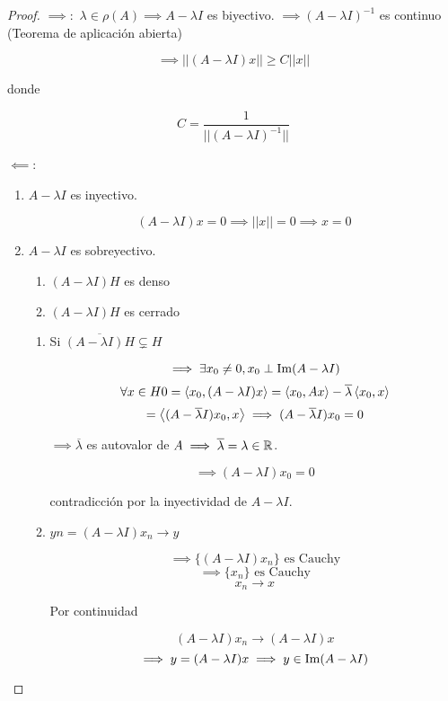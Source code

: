 \begin{proof}
   $\implies:$ $\lambda\in\rho(A)\implies A-\lambda I$ es biyectivo. $\implies (A-\lambda I)^{-1}$ es continuo (Teorema de aplicación abierta)

   \[\implies ||(A-\lambda I)x||\geq C||x||\]

   donde

   \[C=\frac{1}{||(A-\lambda I)^{-1}||}\]

   $\impliedby$: \begin{enumerate}[label=\alph*)]
      \item $A-\lambda I$ es inyectivo.
      
      \[(A-\lambda I)x=0\implies ||x||=0\implies x=0\]

      \item $A-\lambda I$ es sobreyectivo.
      \begin{enumerate}
         \item $(A-\lambda I)H$ es denso 
         \item $(A-\lambda I)H$ es cerrado
      \end{enumerate}
      \begin{enumerate}
         \item Si $\overline{(A-\lambda I)H}\subsetneq H$
         
         \[\implies \exists x_0\neq 0,x_0\perp \operatorname{Im}(A-\lambda I)\]
         \[\forall x\in H 0=\left\langle x_0,(A-\lambda I)x\right\rangle=\left\langle x_0,Ax\right\rangle-\overline{\lambda}\left\langle x_0,x\right\rangle\]
         \[=\left\langle (A-\overline{\lambda}I)x_0,x\right\rangle\implies (A-\overline{\lambda}I)x_0=0\]
         
         $\implies \overline{\lambda}$ es autovalor de $A\implies \overline{\lambda}=\lambda\in \mathbb{R}$.

         \[\implies (A-\lambda I)x_0=0\]

         contradicción por la inyectividad de $A-\lambda I$.

         \item $yn=(A-\lambda I)x_n\to y$
         
         \[\implies \{(A-\lambda I)x_n\}\text{ es Cauchy}\]
         \[\implies \{x_n\}\text{ es Cauchy}\]
         \[x_n\to x\]

         Por continuidad 

         \[(A-\lambda I)x_n\to (A-\lambda I)x\]
         \[\implies y=(A-\lambda I)x\implies y\in\operatorname{Im} (A-\lambda I)\]
      \end{enumerate}
   \end{enumerate}
\end{proof}

